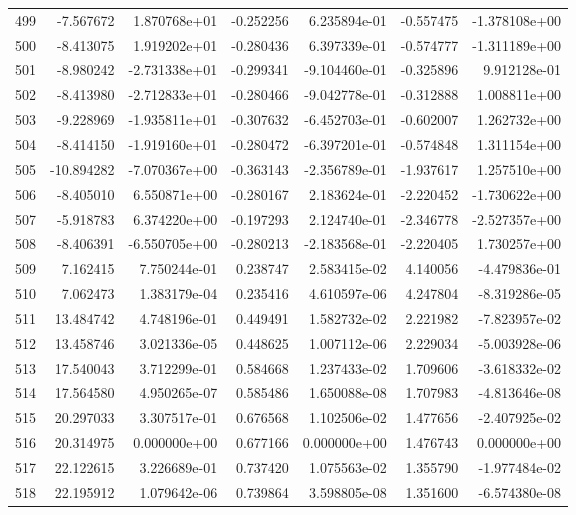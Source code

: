 \begin{tabular}{rrrrrrr}
 499 &  -7.567672 &  1.870768e+01 & -0.252256 &  6.235894e-01 &   -0.557475 & -1.378108e+00 \\
 500 &  -8.413075 &  1.919202e+01 & -0.280436 &  6.397339e-01 &   -0.574777 & -1.311189e+00 \\
 501 &  -8.980242 & -2.731338e+01 & -0.299341 & -9.104460e-01 &   -0.325896 &  9.912128e-01 \\
 502 &  -8.413980 & -2.712833e+01 & -0.280466 & -9.042778e-01 &   -0.312888 &  1.008811e+00 \\
 503 &  -9.228969 & -1.935811e+01 & -0.307632 & -6.452703e-01 &   -0.602007 &  1.262732e+00 \\
 504 &  -8.414150 & -1.919160e+01 & -0.280472 & -6.397201e-01 &   -0.574848 &  1.311154e+00 \\
 505 & -10.894282 & -7.070367e+00 & -0.363143 & -2.356789e-01 &   -1.937617 &  1.257510e+00 \\
 506 &  -8.405010 &  6.550871e+00 & -0.280167 &  2.183624e-01 &   -2.220452 & -1.730622e+00 \\
 507 &  -5.918783 &  6.374220e+00 & -0.197293 &  2.124740e-01 &   -2.346778 & -2.527357e+00 \\
 508 &  -8.406391 & -6.550705e+00 & -0.280213 & -2.183568e-01 &   -2.220405 &  1.730257e+00 \\
 509 &   7.162415 &  7.750244e-01 &  0.238747 &  2.583415e-02 &    4.140056 & -4.479836e-01 \\
 510 &   7.062473 &  1.383179e-04 &  0.235416 &  4.610597e-06 &    4.247804 & -8.319286e-05 \\
 511 &  13.484742 &  4.748196e-01 &  0.449491 &  1.582732e-02 &    2.221982 & -7.823957e-02 \\
 512 &  13.458746 &  3.021336e-05 &  0.448625 &  1.007112e-06 &    2.229034 & -5.003928e-06 \\
 513 &  17.540043 &  3.712299e-01 &  0.584668 &  1.237433e-02 &    1.709606 & -3.618332e-02 \\
 514 &  17.564580 &  4.950265e-07 &  0.585486 &  1.650088e-08 &    1.707983 & -4.813646e-08 \\
 515 &  20.297033 &  3.307517e-01 &  0.676568 &  1.102506e-02 &    1.477656 & -2.407925e-02 \\
 516 &  20.314975 &  0.000000e+00 &  0.677166 &  0.000000e+00 &    1.476743 &  0.000000e+00 \\
 517 &  22.122615 &  3.226689e-01 &  0.737420 &  1.075563e-02 &    1.355790 & -1.977484e-02 \\
 518 &  22.195912 &  1.079642e-06 &  0.739864 &  3.598805e-08 &    1.351600 & -6.574380e-08 \\

\end{tabular}

